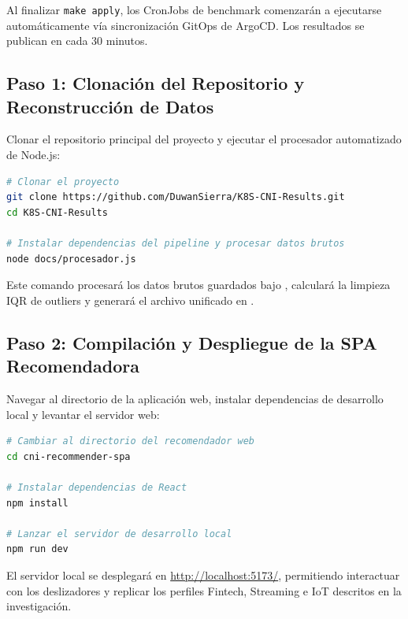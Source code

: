 \noindent Al finalizar \texttt{make apply}, los CronJobs de benchmark
comenzarán a ejecutarse automáticamente vía sincronización GitOps de
ArgoCD. Los resultados se publican en
 cada 30 minutos.

\subsection{Paso 1: Clonación del Repositorio y Reconstrucción de Datos}

Clonar el repositorio principal del proyecto y ejecutar el procesador
automatizado de Node.js:

\begin{lstlisting}[language=bash]
# Clonar el proyecto
git clone https://github.com/DuwanSierra/K8S-CNI-Results.git
cd K8S-CNI-Results

# Instalar dependencias del pipeline y procesar datos brutos
node docs/procesador.js
\end{lstlisting}

Este comando procesará los datos brutos guardados bajo
, calculará la limpieza IQR de outliers
y generará el archivo unificado en
.

\subsection{Paso 2: Compilación y Despliegue de la SPA Recomendadora}

Navegar al directorio de la aplicación web, instalar dependencias de
desarrollo local y levantar el servidor web:

\begin{lstlisting}[language=bash]
# Cambiar al directorio del recomendador web
cd cni-recommender-spa

# Instalar dependencias de React
npm install

# Lanzar el servidor de desarrollo local
npm run dev
\end{lstlisting}

El servidor local se desplegará en \url{http://localhost:5173/},
permitiendo interactuar con los deslizadores y replicar los perfiles
Fintech, Streaming e IoT descritos en la investigación.
